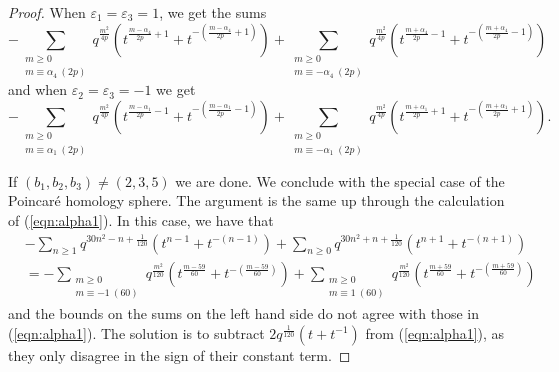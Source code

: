 \documentclass[11pt,letterpaper]{amsart}
\theoremstyle{definition}
\theoremstyle{plain}
\numberwithin{equation}{section}
\theoremstyle{example}
\begin{document}
\begin{proof}
When $\varepsilon_{1}=\varepsilon_{3}=1$, we get the sums
\[-\sum_{\substack{m \geq 0 \\ m \equiv \alpha_4 \ (2p)}} q^{\frac{m^2}{4p}}(t^{\frac{m-\alpha_4}{2p}+1}+t^{-(\frac{m-\alpha_4}{2p}+1)}) + \sum_{\substack{m \geq 0 \\ m \equiv -\alpha_4 \ (2p)}} q^{\frac{m^2}{4p}}(t^{\frac{m+\alpha_4}{2p}-1}+t^{-(\frac{m+\alpha_4}{2p}-1)})
\] and when $\varepsilon_{2}=\varepsilon_{3}=-1$ we get
\[ -\sum_{\substack{m \geq 0 \\ m \equiv \alpha_1 \ (2p)}} q^{\frac{m^2}{4p}}(t^{\frac{m-\alpha_1}{2p}-1}+t^{-(\frac{m-\alpha_1}{2p}-1)}) + \sum_{\substack{m \geq 0 \\ m \equiv -\alpha_1 \ (2p)}} q^{\frac{m^2}{4p}}(t^{\frac{m+\alpha_1}{2p}+1}+t^{-(\frac{m+\alpha_1}{2p}+1)}).\]

If $(b_{1},b_{2},b_{3})\neq(2,3,5)$ we are done. We conclude with the special case of the Poincar\'e homology sphere. The argument is the same up through the calculation of (\ref{eqn:alpha1}).
In this case, we have that
\begin{align*} &- \sum_{n \geq 1} q^{30n^2-n+\frac{1}{120}}(t^{n-1}+t^{-(n-1)}) + \sum_{n \geq 0} q^{30n^2+n+\frac{1}{120}}(t^{n+1}+t^{-(n+1)}) \\ &= -\sum_{\substack{m \geq 0 \\ m \equiv -1 \ (60)}} q^{\frac{m^2}{120}}(t^{\frac{m-59}{60}}+t^{-(\frac{m-59}{60})}) + \sum_{\substack{m \geq 0 \\ m \equiv 1 \ (60)}} q^{\frac{m^2}{120}}(t^{\frac{m+59}{60}}+t^{-(\frac{m+59}{60})})
\end{align*}
and the bounds on the sums on the left hand side do not agree with those in (\ref{eqn:alpha1}). The solution is to subtract $2q^\frac{1}{120}(t+t^{-1})$ from (\ref{eqn:alpha1}), as they only disagree in the sign of their constant term.
\end{proof}
\end{document}
